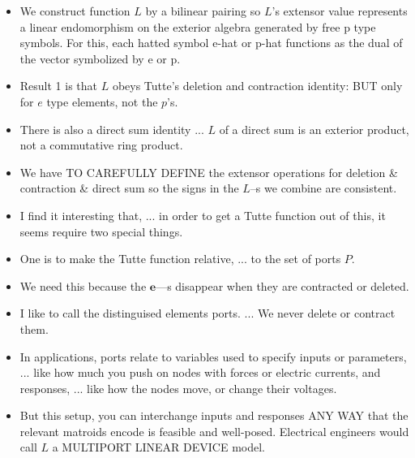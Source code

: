 \documentclass[14pt]{extarticle}
\begin{document}
{\begin{itemize}
  \item We construct function $L$ by a bilinear pairing so 
    $L$'s extensor value represents a linear endomorphism on
    the exterior algebra generated by free p type symbols.  For this, each hatted
    symbol e-hat or p-hat functions as the dual of the vector symbolized by e or p.  

\item Result 1 is that $L$ obeys Tutte's deletion and contraction identity:  BUT
  only for $e$ type elements, not the $p$'s.  

\item There is also a direct sum identity ... $L$ of a direct sum is an exterior product, not
  a commutative ring product.

\item We have TO CAREFULLY DEFINE the extensor operations for deletion \&
  contraction \& direct sum so the signs in the $L$--s we combine are consistent.

\item
  I find it interesting that, ... in order to get a Tutte function out
  of this, it seems require two special things.

\item
One is to make the Tutte function relative, ... to the set of ports $P$.

\item
  We need this because the $\mathbf{e}$---s  disappear when they are contracted or deleted.

\item
  I like to call the distinguised elements ports. ... We never delete or contract them.


\item In applications, ports relate to variables used to specify inputs
  or parameters, ... like how much you push on nodes with forces or electric currents,
  and responses, ... like how the nodes move, or change their voltages.

\item But this setup, you can interchange inputs and responses ANY WAY that the
  relevant matroids encode is feasible and well-posed.  Electrical engineers would
  call $L$ a MULTIPORT LINEAR DEVICE model.



\end{itemize}}
\end{document}
